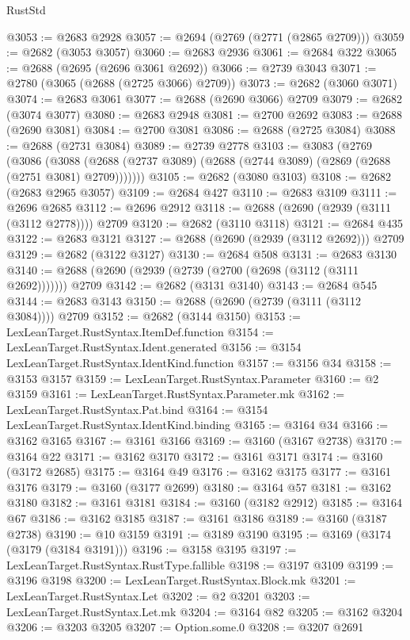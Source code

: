 \begin{lexlean}{RustStd}
\begin{coremodule}
@3053 := @2683 @2928
@3057 := @2694 (@2769 (@2771 (@2865 @2709)))
@3059 := @2682 (@3053 @3057)
@3060 := @2683 @2936
@3061 := @2684 @322
@3065 := @2688 (@2695 (@2696 @3061 @2692))
@3066 := @2739 @3043
@3071 := @2780 (@3065 (@2688 (@2725 @3066) @2709))
@3073 := @2682 (@3060 @3071)
@3074 := @2683 @3061
@3077 := @2688 (@2690 @3066) @2709
@3079 := @2682 (@3074 @3077)
@3080 := @2683 @2948
@3081 := @2700 @2692
@3083 := @2688 (@2690 @3081)
@3084 := @2700 @3081
@3086 := @2688 (@2725 @3084)
@3088 := @2688 (@2731 @3084)
@3089 := @2739 @2778
@3103 := @3083
    (@2769
      (@3086
        (@3088 (@2688 (@2737 @3089) (@2688 (@2744 @3089) (@2869 (@2688 (@2751 @3081) @2709)))))))
@3105 := @2682 (@3080 @3103)
@3108 := @2682 (@2683 @2965 @3057)
@3109 := @2684 @427
@3110 := @2683 @3109
@3111 := @2696 @2685
@3112 := @2696 @2912
@3118 := @2688 (@2690 (@2939 (@3111 (@3112 @2778)))) @2709
@3120 := @2682 (@3110 @3118)
@3121 := @2684 @435
@3122 := @2683 @3121
@3127 := @2688 (@2690 (@2939 (@3112 @2692))) @2709
@3129 := @2682 (@3122 @3127)
@3130 := @2684 @508
@3131 := @2683 @3130
@3140 := @2688 (@2690 (@2939 (@2739 (@2700 (@2698 (@3112 (@3111 @2692))))))) @2709
@3142 := @2682 (@3131 @3140)
@3143 := @2684 @545
@3144 := @2683 @3143
@3150 := @2688 (@2690 (@2739 (@3111 (@3112 @3084)))) @2709
@3152 := @2682 (@3144 @3150)
@3153 := LexLeanTarget.RustSyntax.ItemDef.function
@3154 := LexLeanTarget.RustSyntax.Ident.generated
@3156 := @3154 LexLeanTarget.RustSyntax.IdentKind.function
@3157 := @3156 @34
@3158 := @3153 @3157
@3159 := LexLeanTarget.RustSyntax.Parameter
@3160 := @2 @3159
@3161 := LexLeanTarget.RustSyntax.Parameter.mk
@3162 := LexLeanTarget.RustSyntax.Pat.bind
@3164 := @3154 LexLeanTarget.RustSyntax.IdentKind.binding
@3165 := @3164 @34
@3166 := @3162 @3165
@3167 := @3161 @3166
@3169 := @3160 (@3167 @2738)
@3170 := @3164 @22
@3171 := @3162 @3170
@3172 := @3161 @3171
@3174 := @3160 (@3172 @2685)
@3175 := @3164 @49
@3176 := @3162 @3175
@3177 := @3161 @3176
@3179 := @3160 (@3177 @2699)
@3180 := @3164 @57
@3181 := @3162 @3180
@3182 := @3161 @3181
@3184 := @3160 (@3182 @2912)
@3185 := @3164 @67
@3186 := @3162 @3185
@3187 := @3161 @3186
@3189 := @3160 (@3187 @2738)
@3190 := @10 @3159
@3191 := @3189 @3190
@3195 := @3169 (@3174 (@3179 (@3184 @3191)))
@3196 := @3158 @3195
@3197 := LexLeanTarget.RustSyntax.RustType.fallible
@3198 := @3197 @3109
@3199 := @3196 @3198
@3200 := LexLeanTarget.RustSyntax.Block.mk
@3201 := LexLeanTarget.RustSyntax.Let
@3202 := @2 @3201
@3203 := LexLeanTarget.RustSyntax.Let.mk
@3204 := @3164 @82
@3205 := @3162 @3204
@3206 := @3203 @3205
@3207 := Option.some.{0}
@3208 := @3207 @2691

\end{coremodule}
\end{lexlean}
